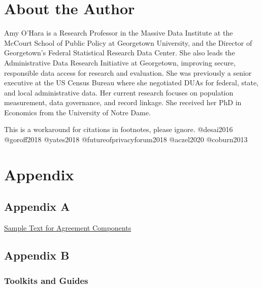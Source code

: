 \documentclass[
]{book}
\begin{document}
\hypertarget{about-the-author}{%
\section*{About the Author}\label{about-the-author}}

Amy O'Hara is a Research Professor in the Massive Data Institute at the McCourt School of Public Policy at Georgetown University, and the Director of Georgetown's Federal Statistical Research Data Center. She also leads the Administrative Data Research Initiative at Georgetown, improving secure, responsible data access for research and evaluation. She was previously a senior executive at the US Census Bureau where she negotiated DUAs for federal, state, and local administrative data. Her current research focuses on population measurement, data governance, and record linkage. She received her PhD in Economics from the University of Notre Dame.

\begin{invisible}
This is a workaround for citations in footnotes, please ignore.
@desai2016 @goroff2018 @yates2018 @futureofprivacyforum2018 @aczel2020
@coburn2013
\end{invisible}

\hypertarget{appendix}{%
\section*{Appendix}\label{appendix}}

\hypertarget{appendix-a}{%
\subsection*{Appendix A}\label{appendix-a}}

\href{./appendix/dua_appendix.pdf}{Sample Text for Agreement Components}

\hypertarget{appendix-b}{%
\subsection*{Appendix B}\label{appendix-b}}

\hypertarget{toolkits-and-guides}{%
\subsubsection*{Toolkits and Guides}\label{toolkits-and-guides}}
\end{document}
